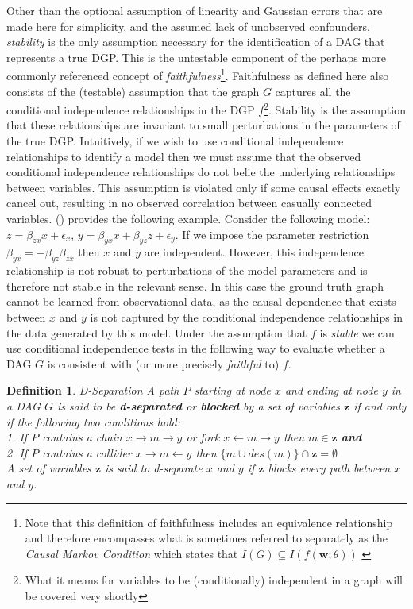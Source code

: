 \documentclass{article}
\newtheorem{definition}{Definition}
\begin{document}
Other than the optional assumption of linearity and Gaussian errors that are made here for simplicity, and the assumed lack of unobserved confounders, \textit{stability} is the only assumption necessary for the identification of a DAG that represents a true DGP. This is the untestable component of the perhaps more commonly referenced concept of \textit{faithfulness}\footnote{Note that this definition of faithfulness includes an equivalence relationship and therefore encompasses what is sometimes referred to separately as the \textit{Causal Markov Condition} which states that $I(G) \subseteq I(f(\mathbf{w};\theta))$ \parencite{spirtes2016causal}}. Faithfulness as defined here also consists of the (testable) assumption that the graph $G$ captures all the conditional independence relationships in the DGP $f$\footnote{What it means for variables to be (conditionally) independent in a graph will be covered very shortly}. Stability is the assumption that these relationships are invariant to small perturbations in the parameters of the true DGP. Intuitively, if we wish to use conditional independence relationships to identify a model then we must assume that the observed conditional independence relationships do not belie the underlying relationships between variables. This assumption is violated only if some causal effects exactly cancel out, resulting in no observed correlation between casually connected variables. \citeauthor{pearl2009causality} (\citeyear{pearl2009causality}) provides the following example. Consider the following model: $z = \beta_{zx} x + \epsilon_x$, $ y = \beta_{yx} x + \beta_{yz} z + \epsilon_y$. If we impose the parameter restriction $\beta_{yx} = -\beta_{yz}\beta_{zx}$ then $x$ and $y$ are independent. However, this independence relationship is not robust to perturbations of the model parameters and is therefore not stable in the relevant sense. In this case the ground truth graph cannot be learned from observational data, as the causal dependence that exists between $x$ and $y$ is not captured by the conditional independence relationships in the data generated by this model. Under the assumption that $f$ is \textit{stable} we can use conditional independence tests in the following way to evaluate whether a DAG $G$ is consistent with (or more precisely \textit{faithful} to) $f$.

\begin{definition}{D-Separation}
  A path $P$ starting at node $x$ and ending at node $y$ in a DAG $G$ is said to be \textbf{d-separated} or \textbf{blocked} by a set of variables $\mathbf{z}$ if and only if the following two conditions hold: \\
  1. If $P$ contains a chain $x \rightarrow m \rightarrow y$ or fork $x \leftarrow m \rightarrow y$ then $m \in \mathbf{z}$ \textbf{and} \\
  2. If $P$ contains a collider $x \rightarrow m \leftarrow y$ then $\{m \cup des(m)\} \cap \mathbf{z} = \emptyset$ \\
  A set of variables $\mathbf{z}$ is said to \textit{d-separate} $x$ and $y$ if $\mathbf{z}$ blocks every path between $x$ and $y$.
  \parencite[p.16]{pearl2009causality}
  \label{dseparation}
\end{definition}
\end{document}
